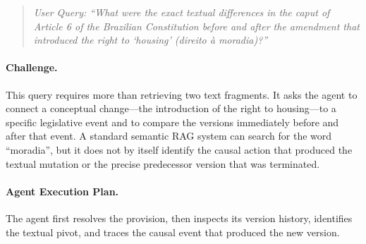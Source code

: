 \documentclass[11pt]{article}
\begin{document}
\begin{quote}
\textit{User Query: ``What were the exact textual differences in the caput of Article 6 of the Brazilian Constitution before and after the amendment that introduced the right to `housing' (direito à moradia)?''}
\end{quote}

\paragraph{Challenge.}
This query requires more than retrieving two text fragments. It asks the agent to connect a conceptual change---the introduction of the right to housing---to a specific legislative event and to compare the versions immediately before and after that event. A standard semantic RAG system can search for the word ``moradia'', but it does not by itself identify the causal action that produced the textual mutation or the precise predecessor version that was terminated.

\paragraph{Agent Execution Plan.}
The agent first resolves the provision, then inspects its version history, identifies the textual pivot, and traces the causal event that produced the new version.
\end{document}
